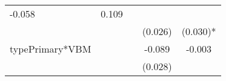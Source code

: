 \documentclass[12pt,twoside]{reedthesis}
\begin{document}
\begin{longtable}[]{@{}lcccc@{}}
\begin{minipage}[t]{0.14\columnwidth}
  -0.058\strut
  \end{minipage} & \begin{minipage}[t]{0.14\columnwidth}\centering\strut
  0.109\strut
  \end{minipage}\tabularnewline
  \begin{minipage}[t]{0.26\columnwidth}\raggedright\strut
  \strut
  \end{minipage} & \begin{minipage}[t]{0.12\columnwidth}\centering\strut
  \strut
  \end{minipage} & \begin{minipage}[t]{0.14\columnwidth}\centering\strut
  \strut
  \end{minipage} & \begin{minipage}[t]{0.14\columnwidth}\centering\strut
  (0.026)\strut
  \end{minipage} & \begin{minipage}[t]{0.14\columnwidth}\centering\strut
  (0.030)*\strut
  \end{minipage}\tabularnewline
  \begin{minipage}[t]{0.26\columnwidth}\raggedright\strut
  typePrimary*VBM\strut
  \end{minipage} & \begin{minipage}[t]{0.12\columnwidth}\centering\strut
  \strut
  \end{minipage} & \begin{minipage}[t]{0.14\columnwidth}\centering\strut
  \strut
  \end{minipage} & \begin{minipage}[t]{0.14\columnwidth}\centering\strut
  -0.089\strut
  \end{minipage} & \begin{minipage}[t]{0.14\columnwidth}\centering\strut
  -0.003\strut
  \end{minipage}\tabularnewline
  \begin{minipage}[t]{0.26\columnwidth}\raggedright\strut
  \strut
  \end{minipage} & \begin{minipage}[t]{0.12\columnwidth}\centering\strut
  \strut
  \end{minipage} & \begin{minipage}[t]{0.14\columnwidth}\centering\strut
  \strut
  \end{minipage} & \begin{minipage}[t]{0.14\columnwidth}\centering\strut
  (0.028)\strut
  \end{minipage} & \begin{minipage}[t]{0.14\columnwidth}\centering\strut

\end{minipage}
\end{longtable}
\end{document}
